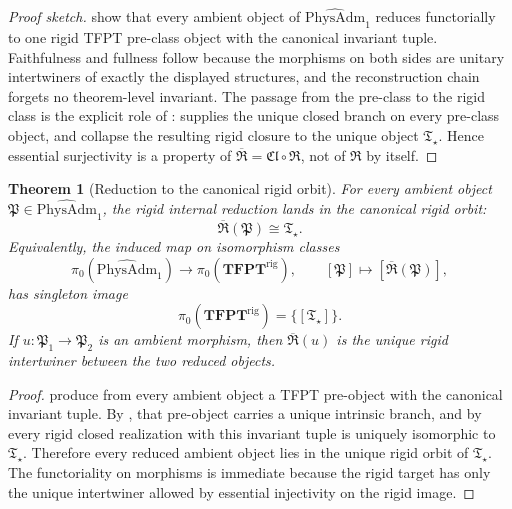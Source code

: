 \documentclass[11pt,a4paper]{article}
\newtheorem{theorem}{Theorem}[section]
\theoremstyle{definition}
\theoremstyle{remark}
\newcommand{\Tstar}{\mathfrak T_{\star}}
\newcommand{\PhysAdmOne}{\widehat{\mathrm{PhysAdm}}_1}
\newcommand{\Runiv}{\mathfrak R}
\newcommand{\Clrig}{\mathfrak{Cl}}
\newcommand{\Runivrig}{\overline{\Runiv}}
\begin{document}
\begin{proof}[Proof sketch]
show that every ambient object of $\PhysAdmOne$ reduces functorially to one rigid TFPT
pre-class object with the canonical invariant tuple. Faithfulness and fullness follow because the
morphisms on both sides are unitary intertwiners of exactly the displayed structures, and the
reconstruction chain forgets no theorem-level invariant. The passage from the pre-class to the
rigid class is the explicit role of : 
supplies the unique closed branch on every pre-class object, and
 collapse the resulting rigid
closure to the unique object $\Tstar$. Hence essential surjectivity is a property of
$\Runivrig=\Clrig\circ\Runiv$, not of $\Runiv$ by itself.
\end{proof}

\fi

\begin{theorem}[Reduction to the canonical rigid orbit]
\label{thm:universality-tfpt}
For every ambient object $\mathfrak P\in\PhysAdmOne$, the rigid internal reduction lands in the
canonical rigid orbit:
\[
\Runivrig(\mathfrak P)\cong \Tstar.
\]
Equivalently, the induced map on isomorphism classes
\[
\pi_0(\PhysAdmOne)\longrightarrow \pi_0(\mathbf{TFPT}^{\mathrm{rig}}),
\qquad
[\mathfrak P]\longmapsto [\Runivrig(\mathfrak P)],
\]
has singleton image
\[
\pi_0(\mathbf{TFPT}^{\mathrm{rig}})=\{[\Tstar]\}.
\]
If $u:\mathfrak P_1\to\mathfrak P_2$ is an ambient morphism, then $\Runivrig(u)$ is the unique rigid
intertwiner between the two reduced objects.
\end{theorem}

\begin{proof}
produce from every ambient object a TFPT pre-object with the canonical invariant tuple. By
, that pre-object carries a unique intrinsic branch, and by
 every rigid closed realization
with this invariant tuple is uniquely isomorphic to $\Tstar$. Therefore every reduced ambient
object lies in the unique rigid orbit of $\Tstar$. The functoriality on morphisms is immediate
because the rigid target has only the unique intertwiner allowed by essential injectivity on the
rigid image.
\end{proof}
\end{document}
